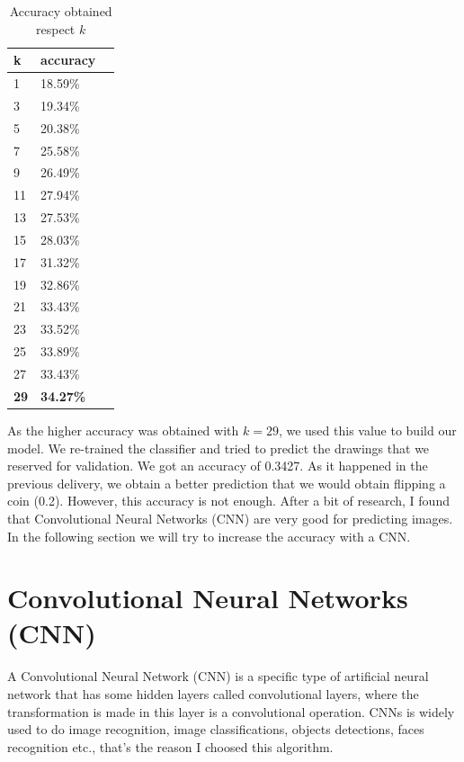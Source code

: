 \documentclass{article}
\begin{document}
\begin{table}[ht]
    \centering
    \begin{tabular}{|l|l|l|}
        \hline
        \textbf{k} & \textbf{accuracy}  \\
        \hline
        1 & 18.59\% \\
        \hline
        3 & 19.34\% \\
        \hline
        5 & 20.38\% \\
        \hline
        7 & 25.58\% \\
        \hline
        9 & 26.49\% \\
        \hline
        11 & 27.94\% \\
        \hline
        13 & 27.53\% \\
        \hline
        15 & 28.03\% \\
        \hline
        17 & 31.32\% \\
        \hline
        19 & 32.86\% \\
        \hline
        21 & 33.43\% \\
        \hline
        23 & 33.52\% \\
        \hline
        25 & 33.89\% \\
        \hline
        27 & 33.43\% \\
        \hline
        \textbf{29} & \textbf{34.27\%} \\
        \hline
    \end{tabular}
    \caption{Accuracy obtained respect $k$}
    \label{tab:knn_results}
\end{table}

As the higher accuracy was obtained with $k=29$, we used this value to build our model. We re-trained the classifier and tried to predict the drawings that we reserved for validation. We got an accuracy of 0.3427. As it happened in the previous delivery, we obtain a better prediction that we would obtain flipping a coin (0.2). However, this accuracy is not enough. After a bit of research, I found that Convolutional Neural Networks (CNN) are very good for predicting images. In the following section we will try to increase the accuracy with a CNN.

\section{Convolutional Neural Networks (CNN)}
\label{CNN}

A Convolutional Neural Network (CNN) is a specific type of artificial neural network that has some hidden layers called convolutional layers, where the transformation is made in this layer is a convolutional operation. CNNs is widely used to do image recognition, image classifications, objects detections, faces recognition etc., that's the reason I choosed this algorithm.
\end{document}
